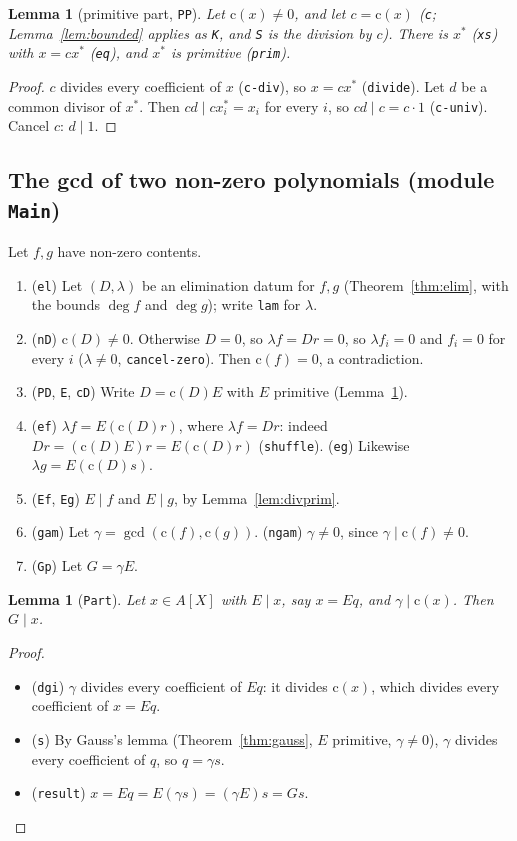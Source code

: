 \documentclass[11pt]{amsart}
\newtheorem{lemma}[theorem]{Lemma}
\theoremstyle{definition}
\theoremstyle{remark}
\newcommand{\nm}[1]{\textup{\texttt{#1}}}
\newcommand{\cont}{\mathrm{c}}
\newcommand{\gcdd}{\operatorname{gcd}}
\begin{document}
\begin{lemma}[primitive part, \nm{PP}]\label{lem:pp}
Let $\cont(x)\neq0$, and let $c = \cont(x)$ (\nm{c}; Lemma~\ref{lem:bounded}
applies as \nm{K}, and \nm{S} is the division by $c$). There is $x^*$
(\nm{xs}) with $x = cx^*$ (\nm{eq}), and $x^*$ is primitive (\nm{prim}).
\end{lemma}
\begin{proof}
$c$ divides every coefficient of $x$ (\nm{c-div}), so $x = cx^*$
(\nm{divide}). Let $d$ be a common divisor of $x^*$. Then
$cd\mid cx^*_i = x_i$ for every $i$, so $cd\mid c = c\cdot1$
(\nm{c-univ}). Cancel $c$: $d\mid1$.
\end{proof}

\subsection{The gcd of two non-zero polynomials (module \nm{Main})}

Let $f,g$ have non-zero contents.
\begin{enumerate}
\item (\nm{el}) Let $(D,\lambda)$ be an elimination datum for $f,g$
  (Theorem~\ref{thm:elim}, with the bounds $\deg f$ and $\deg g$); write
  \nm{lam} for $\lambda$.
\item (\nm{nD}) $\cont(D)\neq0$. Otherwise $D = 0$, so
  $\lambda f = Dr = 0$, so $\lambda f_i = 0$ and $f_i = 0$ for every $i$
  ($\lambda\neq0$, \nm{cancel-zero}). Then $\cont(f) = 0$, a
  contradiction.
\item (\nm{PD}, \nm{E}, \nm{cD}) Write $D = \cont(D)E$ with $E$ primitive
  (Lemma~\ref{lem:pp}).
\item (\nm{ef}) $\lambda f = E(\cont(D)r)$, where $\lambda f = Dr$:
  indeed $Dr = (\cont(D)E)r = E(\cont(D)r)$ (\nm{shuffle}).
  (\nm{eg}) Likewise $\lambda g = E(\cont(D)s)$.
\item (\nm{Ef}, \nm{Eg}) $E\mid f$ and $E\mid g$, by
  Lemma~\ref{lem:divprim}.
\item (\nm{gam}) Let $\gamma = \gcdd(\cont(f),\cont(g))$.
  (\nm{ngam}) $\gamma\neq0$, since $\gamma\mid\cont(f)\neq0$.
\item (\nm{Gp}) Let $G = \gamma E$.
\end{enumerate}

\begin{lemma}[\nm{Part}]\label{lem:mainpart}
Let $x\in A[X]$ with $E\mid x$, say $x = Eq$, and $\gamma\mid\cont(x)$.
Then $G\mid x$.
\end{lemma}
\begin{proof}
\begin{itemize}
\item (\nm{dgi}) $\gamma$ divides every coefficient of $Eq$: it divides
  $\cont(x)$, which divides every coefficient of $x = Eq$.
\item (\nm{s}) By Gauss's lemma (Theorem~\ref{thm:gauss}, $E$
  primitive, $\gamma\neq0$), $\gamma$ divides every coefficient of $q$, so
  $q = \gamma s$.
\item (\nm{result}) $x = Eq = E(\gamma s) = (\gamma E)s = Gs$.\qedhere
\end{itemize}
\end{proof}
\end{document}
